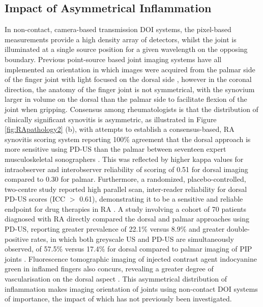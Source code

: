 \documentclass[twoside]{bhamthesis}
\theoremstyle{definition}
\begin{document}


\subsection{Impact of Asymmetrical Inflammation}

In non-contact, camera-based transmission DOI systems, the pixel-based measurements provide a high density array of detectors, whilst the joint is illuminated at a single source position for a given wavelength on the opposing boundary. Previous point-source based joint imaging systems have all implemented an orientation in which images were acquired from the palmar side of the finger joint with light focused on the dorsal side \cite{hielscher2004sagittal,beuthan2002light,prapavat1995evaluation,prapavat1998evaluation,scheel2003laser}, however in the coronal direction, the anatomy of the finger joint is not symmetrical, with the synovium larger in volume on the dorsal than the palmar side to facilitate flexion of the joint when gripping. Consensus among rheumatologists is that the distribution of clinically significant synovitis is asymmetric, as illustrated in Figure \ref{fig:RApathology2} (b), with attempts to establish a consensus-based, RA synovitis scoring system reporting 100\% agreement that the dorsal approach is more sensitive using PD-US than the palmar between seventeen expert musculoskeletal sonographers \cite{d2017scoring}. This was reflected by higher kappa values for intraobserver and interobserver reliability of scoring of 0.51 for dorsal imaging compared to 0.30 for palmar. Furthermore, a randomized, placebo-controlled, two-centre study reported high parallel scan, inter-reader reliability for dorsal PD-US scores (ICC $>$ 0.61), demonstrating it to be a sensitive and reliable endpoint for drug therapies in RA \cite{seymour2012ultrasound}. A study involving a cohort of 70 patients diagnosed with RA directly compared the dorsal and palmar approaches using PD-US, reporting greater prevalence of 22.1\% versus 8.9\% and greater double-positive rates, in which both greyscale US and PD-US are simultaneously observed, of 57.5\% versus 17.4\% for dorsal compared to palmar imaging of PIP joints \cite{witt2014ultrasound}. Fluorescence tomographic imaging of injected contrast agent indocyanine green in inflamed fingers also concurs, revealing a greater degree of vascularisation on the dorsal aspect \cite{mohajerani2014fluorescence}. This asymmetrical distribution of inflammation makes imaging orientation of joints using non-contact DOI systems of importance, the impact of which has not previously been investigated.
\end{document}
